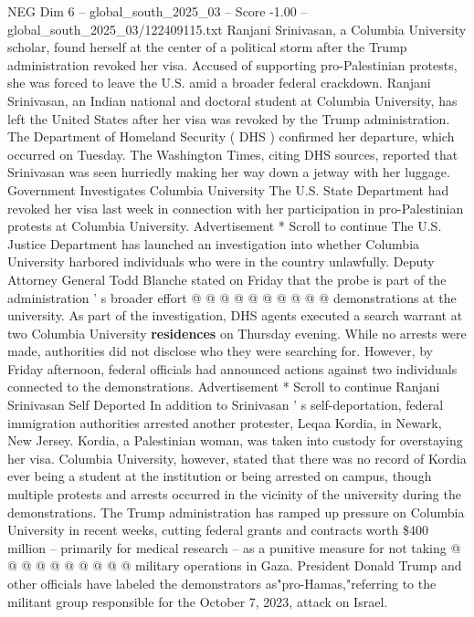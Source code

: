 \begin{textsample}{NEG Dim 6 – global\_south\_2025\_03 – Score -1.00 – global\_south\_2025\_03/122409115.txt}  \label{ex:f6_neg_142}
Ranjani Srinivasan, a Columbia University scholar, found herself at the center of a political storm after the Trump administration revoked her visa.
Accused of supporting pro-Palestinian protests, she was forced to leave the U.S. amid a broader federal crackdown.
Ranjani Srinivasan, an Indian national and doctoral student at Columbia University, has left the United States after her visa was revoked by the Trump administration.
The Department of Homeland Security ( DHS ) confirmed her departure, which occurred on Tuesday.
The Washington Times, citing DHS sources, reported that Srinivasan was seen hurriedly making her way down a jetway with her luggage.
Government Investigates Columbia University The U.S.
State Department had revoked her visa last week in connection with her participation in pro-Palestinian protests at Columbia University.
Advertisement * Scroll to continue The U.S.
Justice Department has launched an investigation into whether Columbia University harbored individuals who were in the country unlawfully.
Deputy Attorney General Todd Blanche stated on Friday that the probe is part of the administration ' s broader effort @ @ @ @ @ @ @ @ @ @ demonstrations at the university.
As part of the investigation, DHS agents executed a search warrant at two Columbia University \textbf{residences} on Thursday evening.
While no arrests were made, authorities did not disclose who they were searching for.
However, by Friday afternoon, federal officials had announced actions against two individuals connected to the demonstrations.
Advertisement * Scroll to continue Ranjani Srinivasan Self Deported In addition to Srinivasan ' s self-deportation, federal immigration authorities arrested another protester, Leqaa Kordia, in Newark, New Jersey.
Kordia, a Palestinian woman, was taken into custody for overstaying her visa.
Columbia University, however, stated that there was no record of Kordia ever being a student at the institution or being arrested on campus, though multiple protests and arrests occurred in the vicinity of the university during the demonstrations.
The Trump administration has ramped up pressure on Columbia University in recent weeks, cutting federal grants and contracts worth \$400 million -- primarily for medical research -- as a punitive measure for not taking @ @ @ @ @ @ @ @ @ @ military operations in Gaza.
President Donald Trump and other officials have labeled the demonstrators as"pro-Hamas,"referring to the militant group responsible for the October 7, 2023, attack on Israel.

\end{textsample}
